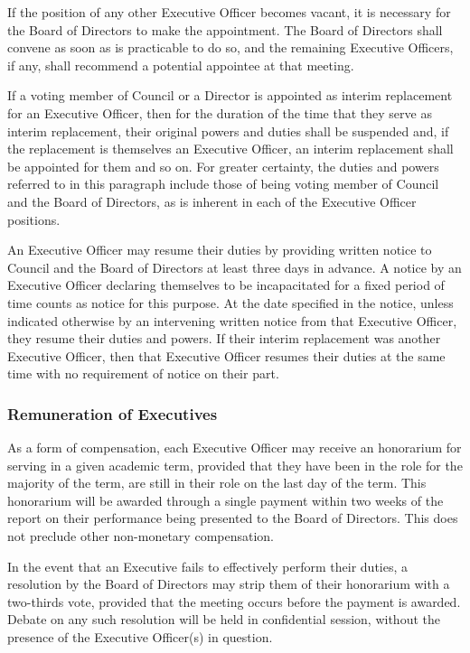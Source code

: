 If the position of any other Executive Officer becomes vacant, it is necessary
for the Board of  Directors to make the appointment. The Board of
Directors shall convene as soon as is practicable to do so, and the remaining
Executive Officers, if any, shall recommend a potential appointee at that
meeting.

If a voting member of Council or a Director is appointed as interim replacement
for an Executive Officer, then for the duration of the time that they serve as
interim replacement, their original powers and duties shall be suspended and,
if the replacement is themselves an Executive Officer, an interim replacement
shall be appointed for them and so on. For greater certainty, the duties and
powers referred to in this paragraph include those of being voting member of
Council and the Board of Directors, as is inherent in each of the Executive
Officer positions.

An Executive Officer may resume their duties by providing written notice to
Council and the Board of Directors at least three days in advance. A
notice by an Executive Officer declaring themselves to be incapacitated for a
fixed period of time counts as notice for this purpose. At the date specified
in the notice, unless indicated otherwise by an intervening written notice from
that Executive Officer, they resume their duties and powers. If their interim
replacement was another Executive Officer, then that Executive Officer resumes
their duties at the same time with no requirement of notice on their part.

\subsubsection{Remuneration of Executives}
As a form of compensation, each Executive Officer may receive an honorarium
for serving in a given academic term, provided that they have been in the role
for the majority of the term, are still in their role on the last day of the
term. This honorarium will be awarded through a single payment within
two weeks of the report on their performance being presented to the Board
of Directors. This does not preclude other non-monetary compensation. 

In the event that an Executive fails to effectively perform their duties,
a resolution by the Board of Directors may strip them of their
honorarium with a two-thirds vote, provided that the meeting occurs before the
payment is awarded. Debate on any such resolution will be held in confidential
session, without the presence of the Executive Officer(s) in question.

